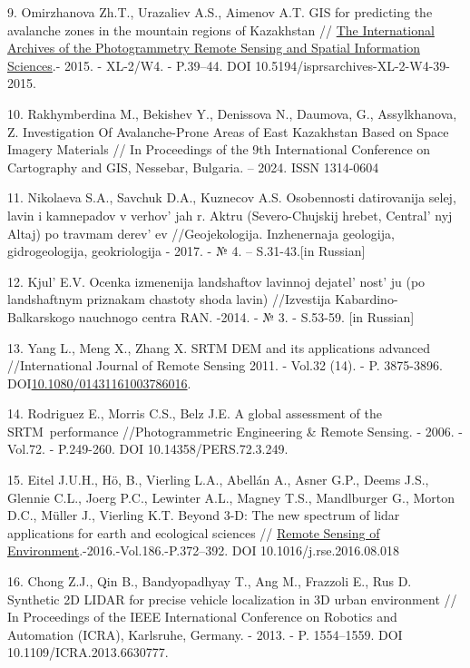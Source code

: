 \begin{references}
9. Omirzhanova Zh.T., Urazaliev A.S., Aimenov A.T. GIS for predicting
the avalanche zones in the mountain regions of Kazakhstan //
\href{https://www.researchgate.net/journal/The-International-Archives-of-the-Photogrammetry-Remote-Sensing-and-Spatial-Information-Sciences-2194-9034?_tp=eyJjb250ZXh0Ijp7ImZpcnN0UGFnZSI6InB1YmxpY2F0aW9uIiwicGFnZSI6InB1YmxpY2F0aW9uIn19}{The
International Archives of the Photogrammetry Remote Sensing and Spatial
Information Sciences}.- 2015. - XL-2/W4. - P.39--44. DOI
10.5194/isprsarchives-XL-2-W4-39-2015.

10. Rakhymberdina M., Bekishev Y., Denissova N., Daumova, G.,
Assylkhanova, Z. Investigation Of Avalanche-Prone Areas of East
Kazakhstan Based on Space Imagery Materials // In Proceedings of the 9th
International Conference on Cartography and GIS, Nessebar, Bulgaria. --
2024. ISSN 1314-0604

11. Nikolaeva S.A., Savchuk D.A., Kuznecov A.S. Osobennosti datirovanija
selej, lavin i kamnepadov v verhov' jah r. Aktru
(Severo-Chujskij hrebet, Central' nyj Altaj) po travmam
derev' ev //Geojekologija. Inzhenernaja geologija,
gidrogeologija, geokriologija - 2017. - № 4. -- S.31-43.{[}in
Russian{]}

12. Kjul'{} E.V. Ocenka izmenenija landshaftov lavinnoj
dejatel' nost' ju (po landshaftnym
priznakam chastoty shoda lavin) //Izvestija Kabardino-Balkarskogo
nauchnogo centra RAN. -2014. - № 3. - S.53-59. {[}in Russian{]}

13. Yang L., Meng X., Zhang X. SRTM DEM and its applications advanced
//International Journal of Remote Sensing 2011. - Vol.32 (14). - P.
3875-3896.
DOI\href{http://dx.doi.org/10.1080/01431161003786016}{10.1080/01431161003786016}.

14. Rodriguez E., Morris C.S., Belz J.E. A global assessment of the
SRTM~performance //Photogrammetric Engineering \& Remote Sensing. -
2006. -Vol.72. - P.249-260. DOI 10.14358/PERS.72.3.249.

15. Eitel J.U.H., Hö, B., Vierling L.A., Abellán A., Asner G.P., Deems
J.S., Glennie C.L., Joerg P.C., Lewinter A.L., Magney T.S., Mandlburger
G., Morton D.C., Müller J., Vierling K.T. Beyond 3-D: The new spectrum
of lidar applications for earth and ecological sciences //
\href{https://asu.elsevierpure.com/en/publications/beyond-3-d-the-new-spectrum-of-lidar-applications-for-earth-and-e}{\hfill\break
Remote Sensing of Environment}.-2016.-Vol.186.-P.372--392. DOI
10.1016/j.rse.2016.08.018

16. Chong Z.J., Qin B., Bandyopadhyay T., Ang M., Frazzoli E., Rus D.
Synthetic 2D LIDAR for precise vehicle localization in 3D urban
environment // In Proceedings of the IEEE International Conference on
Robotics and Automation (ICRA), Karlsruhe, Germany. - 2013. - P.
1554--1559. DOI 10.1109/ICRA.2013.6630777.


\end{references}
